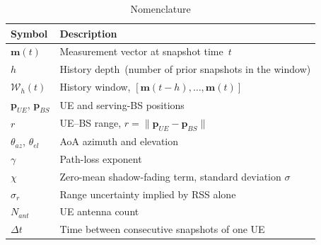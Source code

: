 \begin{table}[h]
  \centering
  \caption{Nomenclature}
  \label{tab:nomenclature}
  \begin{tabular}{@{}ll@{}}
    \toprule
    Symbol & Description \\
    \midrule
    $\mathbf{m}(t)$ & Measurement vector at snapshot time~$t$ \\
    $h$ & History depth~(number of prior snapshots in the window) \\
    $\mathcal{W}_h(t)$ & History window, $[\mathbf{m}(t-h),\dots,\mathbf{m}(t)]$ \\
    $\mathbf{p}_{UE}$, $\mathbf{p}_{BS}$ & UE and serving-BS positions \\
    $r$ & UE--BS range, $r = \lVert \mathbf{p}_{UE} - \mathbf{p}_{BS} \rVert$ \\
    $\theta_{az}$, $\theta_{el}$ & AoA azimuth and elevation \\
    $\gamma$ & Path-loss exponent \\
    $\chi$ & Zero-mean shadow-fading term, standard deviation $\sigma$ \\
    $\sigma_r$ & Range uncertainty implied by RSS alone \\
    $N_{ant}$ & UE antenna count \\
    $\Delta t$ & Time between consecutive snapshots of one UE \\
    \bottomrule
  \end{tabular}
\end{table}
